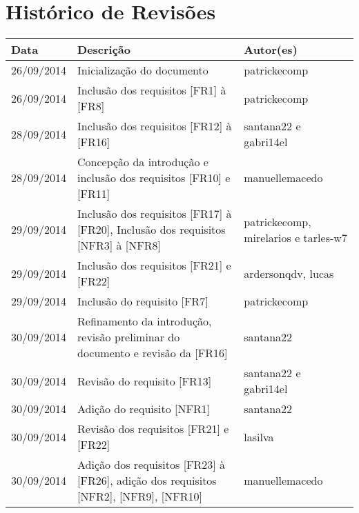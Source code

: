 \documentclass{article}
\begin{document}
\capa

\newpage
	
	\section*{\center Histórico de Revisões}
	  \vspace*{1cm}
	  \begin{table}[ht]
	    \centering
	    \begin{tabular}[pos]{|m{2cm} | m{7.2cm} | m{3.8cm}|} 
	      \hline
	      \cellcolor[gray]{0.9}
	      \textbf{Data} & \cellcolor[gray]{0.9}\textbf{Descrição} & \cellcolor[gray]{0.9}\textbf{Autor(es)}\\ \hline
	      \hline
	      \small 26/09/2014 & \small Inicialização do documento & \small patrickecomp \\ \hline      
	      \small 26/09/2014 & \small Inclusão dos requisitos [FR1] à [FR8] & \small patrickecomp \\ \hline 
	      \small 28/09/2014 & \small Inclusão dos requisitos [FR12] à [FR16] & \small santana22 e gabri14el \\ \hline
	      \small 28/09/2014 & \small Concepção da introdução e inclusão dos requisitos [FR10] e [FR11] & \small manuellemacedo \\ \hline 
	      \small 29/09/2014 & \small Inclusão dos requisitos [FR17] à [FR20], Inclusão dos requisitos [NFR3] à [NFR8] & \small patrickecomp, mirelarios e tarles-w7 \\ \hline    
	      \small 29/09/2014 & \small Inclusão dos requisitos [FR21] e [FR22] & \small ardersonqdv, lucas \\ \hline   
	      \small 29/09/2014 & \small Inclusão do requisito [FR7] & \small patrickecomp \\ \hline 
	      \small 30/09/2014 & \small Refinamento da introdução,  revisão preliminar do documento e revisão da [FR16] & \small santana22 \\ \hline
	      \small 30/09/2014 & \small Revisão do requisito [FR13] & \small santana22 e gabri14el \\ \hline
	      \small 30/09/2014 & \small Adição do requisito [NFR1] & \small santana22 \\ \hline
	      \small 30/09/2014 & \small Revisão dos requisitos [FR21] e [FR22] & \small lasilva\\ \hline
	      \small 30/09/2014 & \small Adição dos requisitos [FR23] à [FR26], adição dos requisitos [NFR2], [NFR9], [NFR10]  & \small manuellemacedo \\ \hline
	    \end{tabular}
	  \end{table}
	
\end{document}
